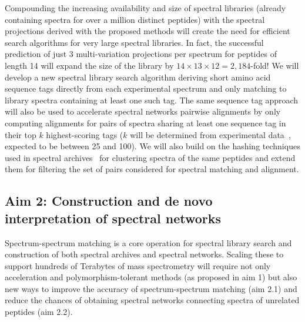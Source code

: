\documentclass[arial,11pt]{article}
\begin{document}
Compounding the increasing availability and size of spectral libraries (already containing spectra for over a million distinct peptides) with the spectral projections derived with the proposed methods will create the need for efficient search algorithms for very large spectral libraries. In fact, the successful prediction of just 3 multi-variation projections per spectrum for peptides of length 14 will expand the size of the library by $14\times 13\times 12=2,184$-fold! We will develop a new spectral library search algorithm deriving short amino acid sequence tags directly from each experimental spectrum and only matching to library spectra containing at least one such tag. The same sequence tag approach will also be used to accelerate spectral networks pairwise alignments by only computing alignments for pairs of spectra sharing at least one sequence tag in their top $k$ highest-scoring tags ($k$ will be determined from experimental data~\cite{frank05p}, expected to be between 25 and 100).
We will also build on the hashing techniques used in spectral archives~\cite{frank11} for clustering spectra of the same peptides and extend them for filtering the set of pairs considered for spectral matching and alignment.

\subsection{Aim 2: Construction and de novo interpretation of spectral networks}

Spectrum-spectrum matching is a core operation for spectral library search and construction of both spectral archives and spectral networks. Scaling these to support hundreds of Terabytes of mass spectrometry will require not only acceleration and polymorphism-tolerant methods (as proposed in aim 1) but also new ways to improve the accuracy of spectrum-spectrum matching (aim 2.1) and reduce the chances of obtaining spectral networks connecting spectra of unrelated peptides (aim 2.2).

\end{document}
